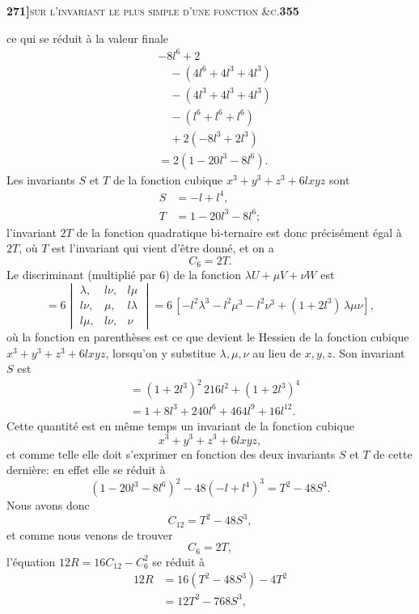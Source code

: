 \documentclass[11pt]{article}
\begin{document}
\newpage
\noindent\textbf{271]}\hfill\textsc{sur l'invariant le plus simple d'une fonction \&c.}\hfill\textbf{355}

\medskip

\noindent ce qui se r\'eduit \`a la valeur finale
\[
\begin{aligned}
& -8 l^6 + 2 \\
& \quad - (4 l^6 + 4 l^3 + 4 l^3) \\
& \quad - (4 l^3 + 4 l^3 + 4 l^3) \\
& \quad - (l^6 + l^6 + l^6) \\
& \quad + 2(-8 l^3 + 2 l^3) \\
& = 2(1 - 20 l^3 - 8 l^6).
\end{aligned}
\]
Les invariants $S$ et $T$ de la fonction cubique $x^3 + y^3 + z^3 + 6 l x y z$ sont
\[
\begin{aligned}
S &= -l + l^4,\\
T &= 1 - 20 l^3 - 8 l^6;
\end{aligned}
\]
l'invariant $2T$ de la fonction quadratique bi-ternaire est donc pr\'ecis\'ement \'egal \`a $2T$, o\`u $T$ est l'invariant qui vient d'\^etre donn\'e, et on a
\[
C_6 = 2 T.
\]
Le discriminant (multipli\'e par 6) de la fonction $\lambda U + \mu V + \nu W$ est
\[
= 6 \begin{vmatrix}
\lambda, & l\nu, & l\mu \\
l\nu, & \mu, & l\lambda \\
l\mu, & l\nu, & \nu
\end{vmatrix}
= 6\, [-l^2 \lambda^3 - l^2 \mu^3 - l^2 \nu^3 + (1 + 2 l^3)\, \lambda \mu \nu ],
\]
o\`u la fonction en parenth\`eses est ce que devient le Hessien de la fonction cubique $x^3 + y^3 + z^3 + 6 l x y z$, lorsqu'on y substitue $\lambda, \mu, \nu$ au lieu de $x, y, z$. Son invariant $S$ est
\[
\begin{aligned}
&= (1 + 2 l^3)^2\, 216 l^2 + (1 + 2 l^3)^4 \\
&= 1 + 8 l^3 + 240 l^6 + 464 l^9 + 16 l^{12}.
\end{aligned}
\]
Cette quantit\'e est en m\^eme temps un invariant de la fonction cubique
\[
x^3 + y^3 + z^3 + 6 l x y z,
\]
et comme telle elle doit s'exprimer en fonction des deux invariants $S$ et $T$ de cette derni\`ere: en effet elle se r\'eduit \`a
\[
(1 - 20 l^3 - 8 l^6)^2 - 48(-l + l^4)^3 = T^2 - 48 S^3.
\]
Nous avons donc
\[
C_{12} = T^2 - 48 S^3,
\]
et comme nous venons de trouver
\[
C_6 = 2 T,
\]
l'\'equation $12 R = 16 C_{12} - C_6^2$ se r\'eduit \`a
\[
\begin{aligned}
12 R &= 16(T^2 - 48 S^3) - 4 T^2 \\
&= 12 T^2 - 768 S^3,
\end{aligned}
\]
\end{document}
